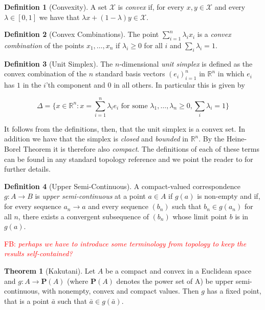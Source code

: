 \documentclass{article}
\theoremstyle{definition}
\newtheorem{definition}{Definition}
\newtheorem{theorem}{Theorem}
\newcommand{\fb}[1]{\textcolor{red}{FB: \textit{#1}}}
\begin{document}
  \begin{definition}[Convexity]
  	A set $\mathcal{X}$ is \emph{convex} if, for every $x, y \in \mathcal{X}$ and every $\lambda \in [0, 1]$ we have that $\lambda x + (1 - \lambda)y \in \mathcal{X}$.
  \end{definition}

	\begin{definition}[Convex Combinations]
		The point $\sum_{i = 1}^{n} \lambda_i x_i$ is a \emph{convex combination} of the points $x_1, \ldots, x_n$ if $\lambda_i \geq 0$ for all $i$ and $\sum_i \lambda_i = 1$.
	\end{definition}

	\begin{definition}[Unit Simplex]
		The $n$-dimensional \emph{unit simplex} is defined as the convex combination of the $n$ standard basis vectors $(e_i)_{i = 1}^n$ in $\mathbb{R}^n$ in which $e_i$ has $1$ in the $i$'th component and $0$ in all others. In particular this is given by
		
		\begin{equation}
			\Delta = \{x \in \mathbb{R}^n : x = \sum_{i = 1}^n \lambda_i e_i \text{ for some } \lambda_1, \ldots, \lambda_n \geq 0, \sum_i \lambda_i = 1\}
		\end{equation}
	\end{definition}
	
	It follows from the definitions, then, that the unit simplex is a convex set. In addition we have that the simplex is \emph{closed} and \emph{bounded} in $\mathbb{R}^n$. By the Heine-Borel Theorem \cite{Royden} it is therefore also \emph{compact}. The definitions of each of these terms can be found in any standard topology reference and we point the reader to \cite{Royden} for further details.

  \begin{definition}[Upper Semi-Continuous] 
    A compact-valued correspondence $g: A \rightarrow B$ is
    \emph{upper semi-continuous} \cite{Findforthis} at a point $a \in A$ if $g(a)$ is non-empty
    and if, for every sequence $a_n \rightarrow a$ and every sequence
    $(b_n)$ such that $b_n \in g(a_n)$ for all $n$, there exists a
    convergent subsequence of $(b_n)$ whose limit point $b$ is in
    $g(a)$.
  \end{definition}

  \fb{perhaps we have to introduce some terminology from topology to keep the results self-contained?}

  \begin{theorem}[Kakutani] 
    Let $A$ be a compact and convex in a Euclidean space and $g: A \rightarrow \mathbf{P}(A)$ (where
    $\mathbf{P}(A)$ denotes the power set of A) be upper semi-continuous, with nonempty, convex and compact values.
    Then $g$ has a fixed point, that is a point $\bar{a}$ such that $\bar{a} \in g(\bar{a})$.
    \cite{Kakutani}
  \end{theorem}
\end{document}
